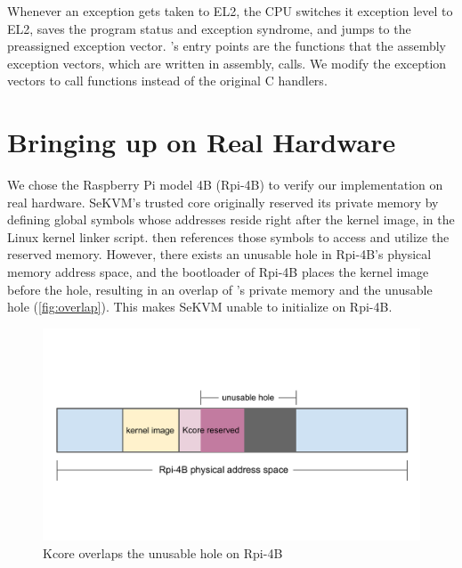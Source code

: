 Whenever an exception gets taken to EL2, the CPU switches it exception level to
EL2, saves the program status and exception syndrome, and jumps to the
preassigned exception vector.
\rustcore{}'s entry points are the functions that the assembly exception
vectors, which are written in assembly, calls.
We modify the exception vectors to call \rustcore{} functions instead of the
original C handlers.

\section{Bringing up \rustsec{} on Real Hardware}

We chose the Raspberry Pi model 4B (Rpi-4B) to verify our implementation on
real hardware.
SeKVM's trusted core \secore{} originally reserved its private memory by
defining global symbols whose addresses reside right after the kernel image,
in the Linux kernel linker script.
\secore{} then references those symbols to access and utilize the reserved
memory.
However, there exists an unusable hole in Rpi-4B's physical memory address
space, and the bootloader of Rpi-4B places the kernel image before the hole,
resulting in an overlap of \secore{}'s private memory and the unusable hole
(\autoref{fig:overlap}). This makes SeKVM unable to initialize on Rpi-4B.

\begin{figure}[hbtp]
    \includegraphics[scale=0.60]{figures/overlap.pdf}
    \caption{Kcore overlaps the unusable hole on Rpi-4B}
    \label{fig:overlap}
\end{figure}

